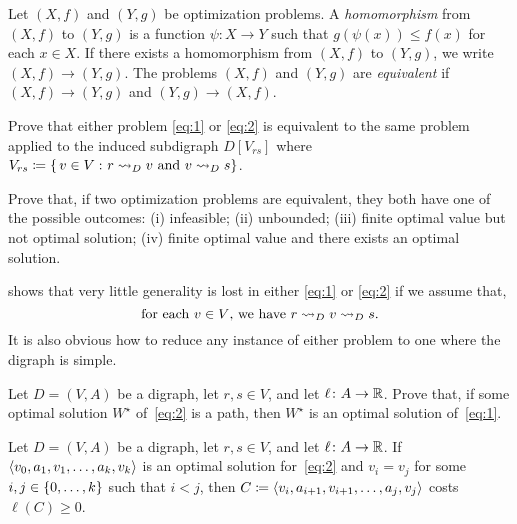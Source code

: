 \documentclass[10pt,reqno]{amsart}
\begin{document}
\begin{definition}
  Let \((X,f)\) and \((Y,g)\) be optimization problems.  A
  \emph{homomorphism} from \((X,f)\) to \((Y,g)\) is a function
  \(\psi \colon X \to Y\) such that \(g(\psi(x)) \leq f(x)\) for each
  \(x \in X\).  If there exists a homomorphism from \((X,f)\) to
  \((Y,g)\), we write \((X,f) \to (Y,g)\).  The problems \((X,f)\) and
  \((Y,g)\) are \emph{equivalent} if \((X,f) \to (Y,g)\) and
  \((Y,g) \to (X,f)\).
\end{definition}

\begin{exercise}
  \label{ex:1}
  Prove that either problem \eqref{eq:1} or \eqref{eq:2} is equivalent
  to the same problem applied to the induced subdigraph \(D[V_{rs}]\)
  where
  \(V_{rs} \coloneqq \{\,{v \in V}\,\colon{r \rightsquigarrow_D v \text{ and }v
    \rightsquigarrow_D s}\}\).
\end{exercise}

\begin{exercise}
  Prove that, if two optimization problems are equivalent, they both
  have one of the possible outcomes: (i) infeasible; (ii) unbounded;
  (iii) finite optimal value but not optimal solution; (iv) finite
  optimal value and there exists an optimal solution.
\end{exercise}

 shows that very little generality is lost in either
\eqref{eq:1} or \eqref{eq:2} if we assume that,
\begin{equation}
  \label{eq:3}
  \text{for each \(v \in V\), we have \(r \rightsquigarrow_D v \rightsquigarrow_D s\).}
\end{equation}
It is also obvious how to reduce any instance of either problem to one
where the digraph is simple.

\begin{exercise}
  \label{ex:2}
  Let \(D = (V,A)\) be a digraph, let \(r,s \in V\), and let
  \(\ell \colon A \to \mathbb{R}\).  Prove that, if some optimal solution
  \(W^\star\) of~\eqref{eq:2} is a path, then \(W^\star\) is an
  optimal solution of~\eqref{eq:1}.
\end{exercise}

\begin{exercise}
  \label{ex:3}
  Let \(D = (V,A)\) be a digraph, let \(r,s \in V\), and let
  \(\ell \colon A \to \mathbb{R}\).  If
  \(\langle v_0,a_1,v_1,\dotsc,a_k,v_k\rangle\) is an optimal solution
  for~\eqref{eq:2} and \(v_i = v_j\) for some
  \(i,j \in \{0,\dotsc,k\}\) such that \(i < j\), then
  \(C \coloneqq \langle v_i,a_{i+1},v_{i+1},\dotsc,a_j,v_j\rangle\) costs
  \(\ell(C) \geq 0\).
\end{exercise}
\end{document}
